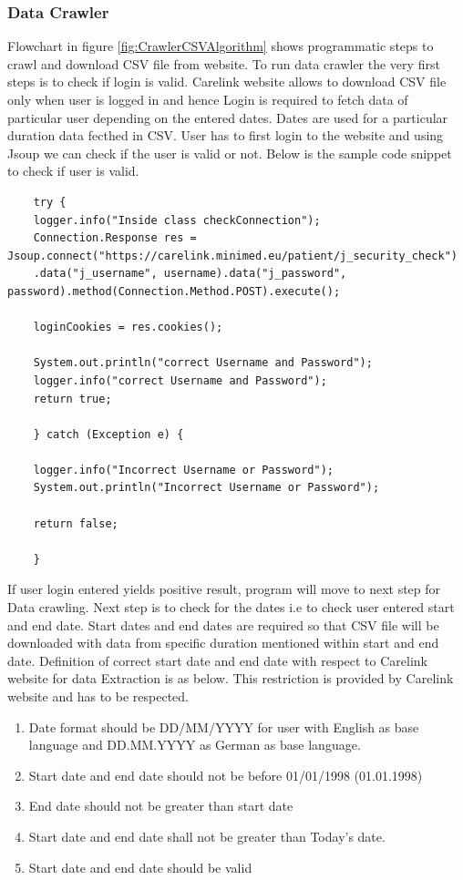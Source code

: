 \documentclass[article,type=msc,colorback,accentcolor=tud9c,twoside,11pt]{tudthesis}
\begin{document}
	
	\subsubsection{Data Crawler}
	\label{subsec:DataCrawler}
	Flowchart in figure \ref{fig:CrawlerCSVAlgorithm} shows programmatic steps to crawl and download CSV file from website. To run data crawler the very first steps is to check if login is valid. Carelink website allows to download CSV file only when user is logged in and hence Login is required to fetch data of particular user depending on the entered dates. Dates are used for a particular duration data fecthed in CSV. User has to first login to the website and using Jsoup we can check if the user is valid or not. Below is the sample code snippet to check if user is valid.
	\begin{lstlisting}
	try {
	logger.info("Inside class checkConnection");
	Connection.Response res = Jsoup.connect("https://carelink.minimed.eu/patient/j_security_check")
	.data("j_username", username).data("j_password", password).method(Connection.Method.POST).execute();
	
	loginCookies = res.cookies();
	
	System.out.println("correct Username and Password");
	logger.info("correct Username and Password");
	return true;
	
	} catch (Exception e) {
	
	logger.info("Incorrect Username or Password");
	System.out.println("Incorrect Username or Password");

	return false;
	
	}
	\end{lstlisting}
	If user login entered yields positive result, program will move to next step for Data crawling. Next step is to check for the dates i.e to check user entered start and end date. Start dates and end dates are required so that CSV file will be downloaded with data from specific duration mentioned within start and end date. Definition of correct start date and end date with respect to Carelink website for data Extraction is as below. This restriction is provided by Carelink website and has to be respected.
	\begin{enumerate}
		\item Date format should be DD/MM/YYYY for user with English as base language and DD.MM.YYYY as German as base language.
		\item Start date and end date should not be before 01/01/1998 (01.01.1998)
		\item End date should not be greater than start date
		\item Start date and end date shall not be greater than Today's date.
		\item Start date and end date should be valid
	\end{enumerate}
\end{document}
